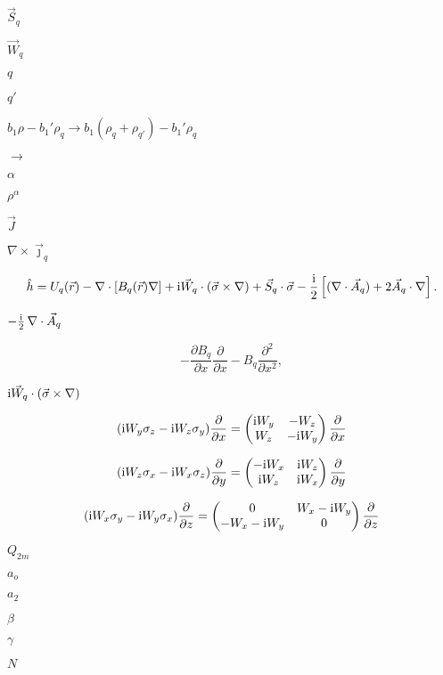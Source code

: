 \documentclass{article}
\begin{document}
$ \vec{S}_q $
\pagebreak

$ \vec W_q $
\pagebreak

$ q $
\pagebreak

$ q' $
\pagebreak

$ b_1\rho-b_1'\rho_q\longrightarrow b_1(\rho_q+\rho_{q'})-b_1'\rho_q $
\pagebreak

$ \longrightarrow $
\pagebreak

$ \alpha $
\pagebreak

$ \rho^\alpha $
\pagebreak

$ \vec J $
\pagebreak

$ \nabla\times\vec\jmath_q $
\pagebreak

\[ \hat h=U_q(\vec r)-\nabla\cdot\left[B_q(\vec r)\nabla\right] +{\mathrm i}\vec W_q\cdot(\vec\sigma\times\nabla) +\vec S_q\cdot\vec\sigma -\frac{{\mathrm i}}{2} \left[(\nabla\cdot\vec A_q)+2\vec A_q\cdot\nabla\right]. \]
\pagebreak

$ -\tfrac{{\mathrm i}}{2}\,\nabla\cdot\vec A_q $
\pagebreak

\[ -\frac{\partial B_q}{\partial x}\frac{\partial}{\partial x}-B_q \frac{\partial^2}{\partial x^2}, \]
\pagebreak

$ {\mathrm i}\vec W_q\cdot(\vec\sigma\times\nabla) $
\pagebreak

\[ ({\mathrm i} W_y\sigma_z-{\mathrm i} W_z\sigma_y)\frac{\partial}{\partial x}= \begin{pmatrix} {\mathrm i} W_y&-W_z\\ W_z&-{\mathrm i} W_y \end{pmatrix}\frac{\partial}{\partial x} \]
\pagebreak

\[ ({\mathrm i} W_z\sigma_x-{\mathrm i} W_x\sigma_z)\frac{\partial}{\partial y}= \begin{pmatrix} -{\mathrm i} W_x&{\mathrm i} W_z\\ {\mathrm i} W_z&{\mathrm i} W_x \end{pmatrix}\frac{\partial}{\partial y} \]
\pagebreak

\[ ({\mathrm i} W_x\sigma_y-{\mathrm i} W_y\sigma_x)\frac{\partial}{\partial z}= \begin{pmatrix} 0&W_x-{\mathrm i} W_y\\ -W_x-{\mathrm i} W_y & 0 \end{pmatrix}\frac{\partial}{\partial z} \]
\pagebreak

$ Q_{2m} $
\pagebreak

$ a_o $
\pagebreak

$ a_2 $
\pagebreak

$ \beta $
\pagebreak

$ \gamma $
\pagebreak

$ N $
\pagebreak
\end{document}
